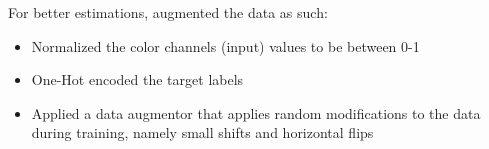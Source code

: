 For better estimations, augmented the data as such:
\begin{itemize}
    \item Normalized the color channels (input) values to be between 0-1
    \item One-Hot encoded the target labels
    \item Applied a data augmentor that applies random modifications to the data during training, namely small shifts and horizontal flips
\end{itemize}